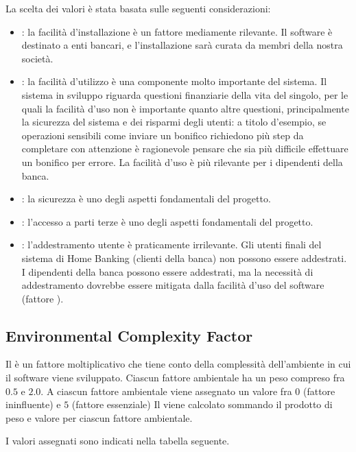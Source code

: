 La scelta dei valori \`e stata basata sulle seguenti considerazioni:
\begin{itemize}
	\item {}: la facilit\`a d'installazione \`e un fattore mediamente rilevante.
		Il software \`e destinato a enti bancari, e l'installazione sar\`a curata da membri della nostra societ\`a.
	\item {}: la facilit\`a d'utilizzo \`e una componente molto importante del sistema.
		Il sistema in sviluppo riguarda questioni finanziarie della vita del singolo, per le quali la facilit\`a d'uso non \`e importante quanto altre questioni, principalmente la sicurezza del sistema e dei risparmi degli utenti: a titolo d'esempio, se operazioni sensibili come inviare un bonifico richiedono pi\`u step da completare con attenzione \`e ragionevole pensare che sia pi\`u difficile effettuare un bonifico per errore.
		La facilit\`a d'uso \`e pi\`u rilevante per i dipendenti della banca.
	\item {}: la sicurezza \`e uno degli aspetti fondamentali del progetto.
	\item {}: l'accesso a parti terze \`e uno degli aspetti fondamentali del progetto.
	\item {}: l'addestramento utente \`e praticamente irrilevante.
		Gli utenti finali del sistema di Home Banking (clienti della banca) non possono essere addestrati.
		I dipendenti della banca possono essere addestrati, ma la necessit\`a di addestramento dovrebbe essere mitigata dalla facilit\`a d'uso del software (fattore ).
\end{itemize}

\subsection{Environmental Complexity Factor}

Il  \`e un fattore moltiplicativo che tiene conto della complessit\`a dell'ambiente in cui il software viene sviluppato.
Ciascun fattore ambientale ha un peso compreso fra $0.5$ e $2.0$.
A ciascun fattore ambientale viene assegnato un valore fra $0$ (fattore ininfluente) e $5$ (fattore essenziale)
Il  viene calcolato sommando il prodotto di peso e valore per ciascun fattore ambientale.

I valori assegnati sono indicati nella tabella seguente.

